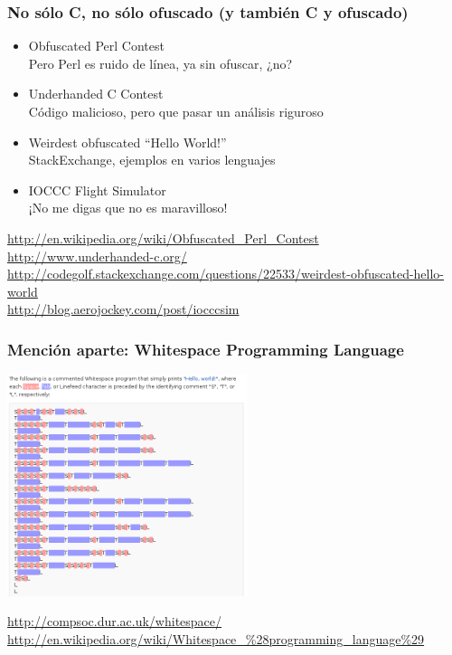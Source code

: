 \begin{frame}[fragile]
\frametitle{No sólo C, no sólo ofuscado (y también C y ofuscado)}

\begin{itemize}
\item Obfuscated Perl Contest \\
  Pero Perl es ruido de línea, ya sin ofuscar, ¿no?
\item Underhanded C Contest \\
  Código malicioso, pero que pasar un análisis riguroso
\item Weirdest obfuscated ``Hello World!'' \\
  StackExchange, ejemplos en varios lenguajes
\item IOCCC Flight Simulator \\
  ¡No me digas que no es maravilloso!
\end{itemize}

\begin{flushright}
{\small
\url{http://en.wikipedia.org/wiki/Obfuscated_Perl_Contest} \\
\url{http://www.underhanded-c.org/} \\
\url{http://codegolf.stackexchange.com/questions/22533/weirdest-obfuscated-hello-world} \\
\url{http://blog.aerojockey.com/post/iocccsim} \\
}
\end{flushright}
\end{frame}

\begin{frame}
\frametitle{Mención aparte: Whitespace Programming Language}

\begin{center}
\includegraphics[width=7cm]{figs/obfuscated-whitespace}
\end{center}

\begin{flushright}
{\footnotesize
\url{http://compsoc.dur.ac.uk/whitespace/} \\
\url{http://en.wikipedia.org/wiki/Whitespace_\%28programming_language\%29}
}
\end{flushright}

\end{frame}

